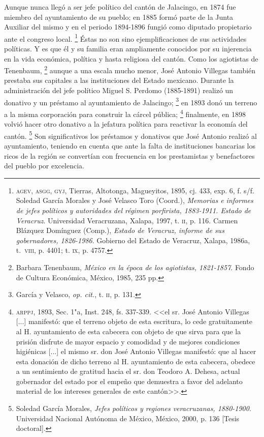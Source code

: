 \documentclass[14pt,twoside,final]{extbook} %
\let\oldfootnote\footnote
\renewcommand\footnote[1]{%
\oldfootnote{\hspace{1mm}#1}}
\begin{document}
Aunque nunca llegó a ser jefe político del cantón de Jalacingo, en 1874 fue miembro del ayuntamiento de su pueblo; en 1885 formó parte de la Junta Auxiliar del mismo y en el periodo 1894-1896 fungió como diputado propietario ante el congreso local.\footnote{\textsc{agev, asgg, gyj}, Tierras, Altotonga, Magueyitos, 1895, cj. 433, exp. 6, f. s/f. Soledad García Morales y José Velasco Toro (Coord.), \emph{Memorias e informes de jefes políticos y autoridades del régimen porfirista, 1883-1911. Estado de Veracruz}. Universidad Veracruzana, Xalapa, 1997, t. \textsc{ii}, p. 116. Carmen Blázquez Domínguez (Comp.), \emph{Estado de Veracruz, informe de sus gobernadores, 1826-1986}. Gobierno del Estado de Veracruz, Xalapa, 1986a, t.~\textsc{viii}, p. 4401; t. \textsc{ix}, p. 4757.} Éstas no son sino ejemplificaciones de sus actividades políticas. Y es que él y su familia eran ampliamente conocidos por su injerencia en la vida económica, política y hasta religiosa del cantón. Como los agiotistas de Tenenbaum,\footnote{Barbara Tenenbaum, \emph{México en la época de los agiotistas, 1821-1857}. Fondo de Cultura Económica, México, 1985, 235 pp.} aunque a una escala mucho menor, José Antonio Villegas también prestaba sus capitales a las instituciones del Estado mexicano. Durante la administración del jefe político Miguel S. Perdomo (1885-1891) realizó un donativo y un préstamo al ayuntamiento de Jalacingo;\footnote{García y Velasco, \emph{op. cit.}, t. \textsc{ii}, p. 131.} en 1893 donó un terreno a la misma corporación para construir la cárcel pública;\footnote{\textsc{arppj}, 1893, Sec. 1"a, Inst. 248, fs. 337-339. <<el sr. José Antonio Villegas [...] manifestó: que el terreno objeto de esta escritura, lo cede gratuitamente al H. ayuntamiento de esta cabecera con objeto de que sirva para que la prisión disfrute de mayor espacio y comodidad y de mejores condiciones higiénicas [...] el mismo sr. don José Antonio Villegas manifestó: que al hacer esta donación de dicho terreno al H. ayuntamiento de esta cabecera, obedece a un sentimiento de gratitud hacia el sr. don Teodoro A. Dehesa, actual gobernador del estado por el empeño que demuestra a favor del adelanto material de los intereses generales de este cantón>>.} finalmente, en 1898 volvió hacer otro donativo a la jefatura política para reactivar la economía del cantón.\footnote{Soledad García Morales, \emph{Jefes políticos y regiones veracruzanas, 1880-1900}. Universidad Nacional Autónoma de México, México, 2000, p. 136 [Tesis doctoral].} Son significativos los préstamos y donativos que José Antonio realizó al ayuntamiento, teniendo en cuenta que ante la falta de instituciones bancarias los ricos de la región se convertían con frecuencia en los prestamistas y benefactores del pueblo por excelencia.
\end{document}
